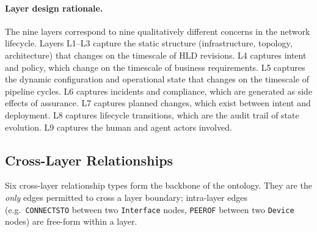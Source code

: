 \documentclass[acmtog]{acmart}
\renewcommand\_{\textunderscore\allowbreak}
\begin{document}
\paragraph{Layer design rationale.}
The nine layers correspond to nine qualitatively different concerns
in the network lifecycle. Layers L1--L3 capture the static
structure (infrastructure, topology, architecture) that changes on
the timescale of HLD revisions. L4 captures intent and policy,
which change on the timescale of business requirements. L5 captures
the dynamic configuration and operational state that changes on the
timescale of pipeline cycles. L6 captures incidents and compliance,
which are generated as side effects of assurance. L7 captures
planned changes, which exist between intent and deployment. L8
captures lifecycle transitions, which are the audit trail of state
evolution. L9 captures the human and agent actors involved.


\subsection{Cross-Layer Relationships}\label{sec:ssot:rels}

Six cross-layer relationship types form the backbone of the
ontology. They are the \emph{only} edges permitted to cross a layer
boundary; intra-layer edges (e.g.\ \texttt{CONNECTS\_TO} between two
\texttt{Interface} nodes, \texttt{PEER\_OF} between two
\texttt{Device} nodes) are free-form within a layer.
\end{document}
